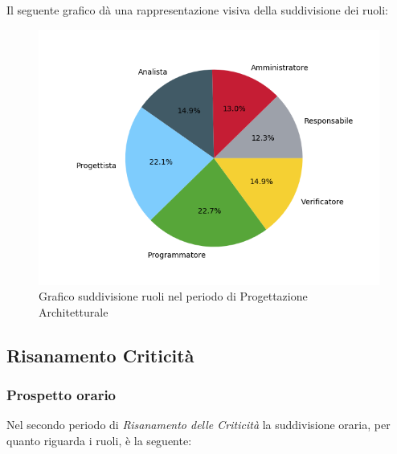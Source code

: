 Il seguente grafico dà una rappresentazione visiva della suddivisione dei ruoli:
\begin{figure}[H]
	\centering
  		\includegraphics[width=1\linewidth]{./images/torta_pa.png}
  		\caption{Grafico suddivisione ruoli nel periodo di Progettazione Architetturale}
  		\label{fig:grafico suddivione ruoli pa}
\end{figure}

\newpage
\subsection{Risanamento Criticità}
\label{PRC2}

\subsubsection{Prospetto orario}
Nel secondo periodo di \textit{Risanamento delle Criticità} la suddivisione oraria, per quanto riguarda i ruoli, è la seguente: 


